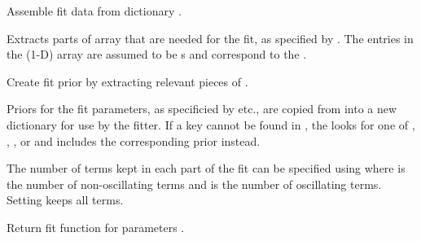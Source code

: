 \documentclass[letterpaper,10pt,english]{sphinxmanual}
\begin{document}
\begin{fulllineitems}
\begin{quote}
\begin{description}
\end{description}\end{quote}

\begin{fulllineitems}
\label{corrfitter:corrfitter.Corr3.builddata}
Assemble fit data from dictionary .

Extracts parts of array  that are needed for
the fit, as specified by . The entries in the (1-D)
array  are assumed to be s and
correspond to the .

\end{fulllineitems}


\begin{fulllineitems}
\label{corrfitter:corrfitter.Corr3.buildprior}
Create fit prior by extracting relevant pieces of .

Priors for the fit parameters, as specificied by  etc., 
are copied from  into a new dictionary for use by the
fitter. If a key  cannot be found in , the
 looks for one of , , 
, or  and includes the corresponding
prior instead.

The number of terms kept in each part of the fit can be 
specified using  where  is the 
number of non-oscillating terms and  is the number 
of oscillating terms. Setting  keeps 
all terms.

\end{fulllineitems}


\begin{fulllineitems}
\label{corrfitter:corrfitter.Corr3.fitfcn}
Return fit function for parameters .

\end{fulllineitems}


\end{fulllineitems}
\end{document}
